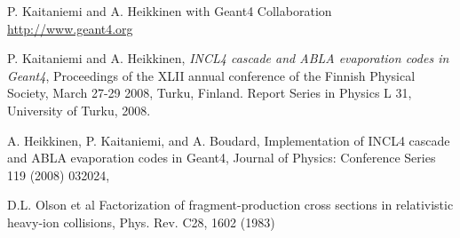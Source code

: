 \documentclass[12pt]{article}
\begin{document}



\begin{thebibliography}{9}

P. Kaitaniemi and A. Heikkinen with Geant4 Collaboration
\href{http://www.geant4.org}{http://www.geant4.org}

P. Kaitaniemi and A. Heikkinen,  
{\em INCL4 cascade and ABLA evaporation codes in Geant4},
Proceedings of the XLII annual conference of the Finnish Physical Society, 
                 March 27-29 2008, Turku, Finland. 
                 Report Series in Physics L 31, University of Turku, 2008.

A. Heikkinen, P. Kaitaniemi, and A. Boudard,
Implementation of INCL4 cascade and ABLA evaporation codes in Geant4,
Journal of Physics: Conference Series 119 (2008) 032024, 
{\sf [doi:10.1088/1742-6596/119/3/032024]}

D.L. Olson et al
Factorization of fragment-production cross sections in relativistic heavy-ion collisions,
Phys. Rev. C28, 1602 (1983)
{}

\end{thebibliography}
\end{document}
